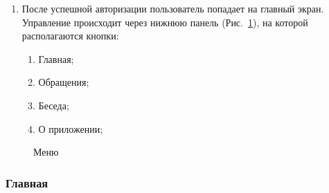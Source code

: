 \documentclass{../includes/TechDoc}
\begin{document}
\begin{enumerate}
        \item После успешной авторизации пользователь попадает на главный экран.
        Управление происходит через нижнюю панель (Рис.~\ref{fig:menu}), на которой располагаются кнопки:
        \begin{enumerate}[noitemsep]
            \item Главная;
            \item Обращения;
            \item Беседа;
            \item О приложении;
        \end{enumerate}
    \end{enumerate}

    \begin{figure}[ht]
        \centering
        \caption{Меню}
        \label{fig:menu}
    \end{figure}

    \clearpage

    \subsubsection{Главная}
\end{document}
